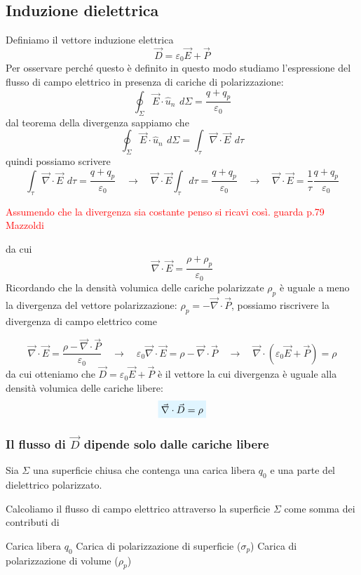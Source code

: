 \documentclass[x11names]{report}
\newcommand{\viola}[1]{%
	\colorbox{myblue}{$\displaystyle #1$}
}
\begin{document}
\subsection{Induzione dielettrica}
Definiamo il vettore induzione elettrica
\[
\vec{D} = \varepsilon_0\vec{E} + \vec{P	}
\]
Per osservare perché questo è definito in questo modo studiamo l'espressione del flusso di campo elettrico in presenza di cariche di polarizzazione:
\[
\oint_{\Sigma} \vec{E} \cdot \hat{u}_n \,\ d\Sigma = \frac{q + q_p}{\varepsilon_0}
\]
dal teorema della divergenza sappiamo che 
\[
\oint_{\Sigma}\vec{E} \cdot \hat{u}_n \,\ d\Sigma = \int_{\tau} \vec{\nabla}\cdot \vec{E} \,\ d\tau
\]
quindi possiamo scrivere
\[
\int_{\tau} \vec{\nabla}\cdot \vec{E} \,\ d\tau = \frac{q + q_p}{\varepsilon_0} \quad \to \quad \vec{\nabla}\cdot \vec{E} \int_{\tau}  d\tau = \frac{q + q_p}{\varepsilon_0} \quad \to \quad \vec{\nabla}\cdot \vec{E} = \frac{1}{\tau}  \frac{q + q_p}{\varepsilon_0}
\]
\begin{center}
	\textcolor{red}{Assumendo che la divergenza sia costante penso si ricavi così. guarda p.79 Mazzoldi}
\end{center}
da cui
\[
\vec{\nabla}\cdot \vec{E} = \frac{\rho + \rho_p}{\varepsilon_0}
\]
Ricordando che la densità volumica delle cariche polarizzate \(\rho_p\) è uguale a meno la divergenza del vettore polarizzazione: \(\rho_p = - \vec{\nabla}\cdot \vec{P}\), possiamo riscrivere la divergenza di campo elettrico come

\[
\vec{\nabla}\cdot \vec{E} = \frac{\rho - \vec{\nabla}\cdot \vec{P}}{\varepsilon_0}  \quad \to \quad \varepsilon_0\vec{\nabla}\cdot \vec{E} = \rho - \vec{\nabla}\cdot \vec{P} \quad \to \quad \vec{\nabla} \cdot \left(\varepsilon_0\vec{E} + \vec{P}\right) = \rho
\]
da cui otteniamo che \(\vec{D} = \varepsilon_0\vec{E} + \vec{P}\) è il vettore la cui divergenza è uguale alla densità volumica delle cariche libere:
\begin{equation}
	\viola{\vec{\nabla} \cdot \vec{D}= \rho} 
\end{equation}

\subsubsection{Il flusso di \(\vec{D}\) dipende solo dalle cariche libere}
Sia \(\Sigma\) una superficie chiusa che contenga una carica libera \(q_0\) e una parte del dielettrico polarizzato. 

Calcoliamo il flusso di campo elettrico attraverso la superficie \(\Sigma\) come somma dei contributi di
\begin{center}
	 Carica libera \(q_0\) \hspace{0.2cm} Carica di polarizzazione di superficie (\(\sigma_p\)) \hspace{0.2cm} Carica di polarizzazione di volume (\(\rho_p\))
\end{center}
\end{document}
